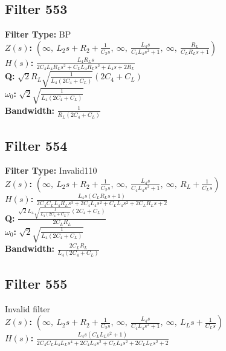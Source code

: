 \documentclass{article}
\begin{document}
\subsection*{Filter 553}
\textbf{Filter Type:} BP \\ 
\textbf{$Z(s)$:} $\left( \infty, \  L_{2} s + R_{2} + \frac{1}{C_{2} s}, \  \infty, \  \frac{L_{4} s}{C_{4} L_{4} s^{2} + 1}, \  \infty, \  \frac{R_{L}}{C_{L} R_{L} s + 1}\right)$ \\ 
\textbf{$H(s)$:} $\frac{L_{4} R_{L} s}{2 C_{4} L_{4} R_{L} s^{2} + C_{L} L_{4} R_{L} s^{2} + L_{4} s + 2 R_{L}}$ \\ 
\textbf{Q:} $\sqrt{2} R_{L} \sqrt{\frac{1}{L_{4} \left(2 C_{4} + C_{L}\right)}} \left(2 C_{4} + C_{L}\right)$ \\ 
\textbf{$\omega_0$:} $\sqrt{2} \sqrt{\frac{1}{L_{4} \left(2 C_{4} + C_{L}\right)}}$ \\ 
\textbf{Bandwidth:} $\frac{1}{R_{L} \left(2 C_{4} + C_{L}\right)}$ \\ 
\subsection*{Filter 554}
\textbf{Filter Type:} Invalid110 \\ 
\textbf{$Z(s)$:} $\left( \infty, \  L_{2} s + R_{2} + \frac{1}{C_{2} s}, \  \infty, \  \frac{L_{4} s}{C_{4} L_{4} s^{2} + 1}, \  \infty, \  R_{L} + \frac{1}{C_{L} s}\right)$ \\ 
\textbf{$H(s)$:} $\frac{L_{4} s \left(C_{L} R_{L} s + 1\right)}{2 C_{4} C_{L} L_{4} R_{L} s^{3} + 2 C_{4} L_{4} s^{2} + C_{L} L_{4} s^{2} + 2 C_{L} R_{L} s + 2}$ \\ 
\textbf{Q:} $\frac{\sqrt{2} L_{4} \sqrt{\frac{1}{L_{4} \left(2 C_{4} + C_{L}\right)}} \left(2 C_{4} + C_{L}\right)}{2 C_{L} R_{L}}$ \\ 
\textbf{$\omega_0$:} $\sqrt{2} \sqrt{\frac{1}{L_{4} \left(2 C_{4} + C_{L}\right)}}$ \\ 
\textbf{Bandwidth:} $\frac{2 C_{L} R_{L}}{L_{4} \left(2 C_{4} + C_{L}\right)}$ \\ 
\subsection*{Filter 555}
Invalid filter \\ 
\textbf{$Z(s)$:} $\left( \infty, \  L_{2} s + R_{2} + \frac{1}{C_{2} s}, \  \infty, \  \frac{L_{4} s}{C_{4} L_{4} s^{2} + 1}, \  \infty, \  L_{L} s + \frac{1}{C_{L} s}\right)$ \\ 
\textbf{$H(s)$:} $\frac{L_{4} s \left(C_{L} L_{L} s^{2} + 1\right)}{2 C_{4} C_{L} L_{4} L_{L} s^{4} + 2 C_{4} L_{4} s^{2} + C_{L} L_{4} s^{2} + 2 C_{L} L_{L} s^{2} + 2}$ \\ 
\end{document}
